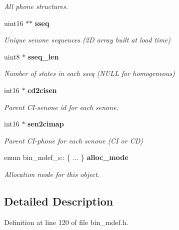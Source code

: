 \begin{DoxyCompactItemize}
\begin{DoxyCompactList}\small\item\em All phone structures. \end{DoxyCompactList}\item 
uint16 $\ast$$\ast$ {\bf sseq}\label{structbin__mdef__s_acb58480658812de7a357dcbd25ad7b41}

\begin{DoxyCompactList}\small\item\em Unique senone sequences (2\-D array built at load time) \end{DoxyCompactList}\item 
uint8 $\ast$ {\bf sseq\-\_\-len}\label{structbin__mdef__s_ab534bbd280015795b8e8ca4e296f4946}

\begin{DoxyCompactList}\small\item\em Number of states in each sseq (N\-U\-L\-L for homogeneous) \end{DoxyCompactList}\item 
int16 $\ast$ {\bf cd2cisen}\label{structbin__mdef__s_ad5e814ffa116c85d46359e3ffd40bff7}

\begin{DoxyCompactList}\small\item\em Parent C\-I-\/senone id for each senone. \end{DoxyCompactList}\item 
int16 $\ast$ {\bf sen2cimap}\label{structbin__mdef__s_a457e5352e52a57de5d1536bcd6b331a9}

\begin{DoxyCompactList}\small\item\em Parent C\-I-\/phone for each senone (C\-I or C\-D) \end{DoxyCompactList}\item 
enum bin\-\_\-mdef\-\_\-s\-:: \{ ... \}  {\bf alloc\-\_\-mode}
\begin{DoxyCompactList}\small\item\em Allocation mode for this object. \end{DoxyCompactList}\end{DoxyCompactItemize}


\subsection{Detailed Description}


Definition at line 120 of file bin\-\_\-mdef.\-h.




